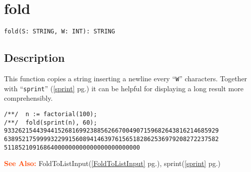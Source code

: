 \documentclass[a4paper]{mybook}
\newenvironment{command}{}{} %
\newcommand\SeeAlso{\par\textcolor{OrangeRed}{\textbf{\large See Also: }}}
\begin{document}
\section{fold}
\label{fold}
\begin{command} %


\begin{Verbatim}[label=syntax, rulecolor=\color{MidnightBlue},
frame=single]
fold(S: STRING, W: INT): STRING
\end{Verbatim}


\subsection*{Description}

This function copies a string inserting a newline every ``\verb&W&''
characters.  Together with ``\verb&sprint&'' (\ref{sprint} pg.\pageref{sprint}) it can be helpful for
displaying a long result more comprehensibly.
\begin{Verbatim}[label=example, rulecolor=\color{PineGreen}, frame=single]
/**/  n := factorial(100);
/**/  fold(sprint(n), 60);
933262154439441526816992388562667004907159682643816214685929
638952175999932299156089414639761565182862536979208272237582
51185210916864000000000000000000000000
\end{Verbatim}


\SeeAlso %
  FoldToListInput(\ref{FoldToListInput} pg.\pageref{FoldToListInput}), 
    sprint(\ref{sprint} pg.\pageref{sprint})
\end{command} %
\end{document}
